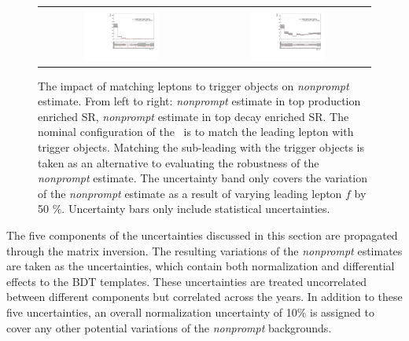 \begin{figure}[tbh!]
 \begin{center}
 \begin{tabular}{cc}
 \includegraphics[width=0.47\textwidth]{figures/Part3/Systematics/BDT_ST_MM}&
 \includegraphics[width=0.47\textwidth]{figures/Part3/Systematics/BDT_TT_MM} \\
 \end{tabular}
 \caption{The impact of matching leptons to trigger objects on \emph{nonprompt} estimate. From left to right: \emph{nonprompt} estimate in top production enriched \ac{SR}, \emph{nonprompt} estimate in top decay enriched \ac{SR}. The nominal configuration of the \mm~is to match the leading lepton with trigger objects. Matching the sub-leading with the trigger objects is taken as an alternative to evaluating the robustness of the \emph{nonprompt} estimate. The uncertainty band only covers the variation of the \emph{nonprompt} estimate as a result of varying leading lepton $f$ by 50 $\%$. Uncertainty bars only include statistical uncertainties.}
 \label{fig:MM_trigger}
 \end{center}
\end{figure}

The five components of the uncertainties discussed in this section are propagated through the matrix inversion. The resulting variations of the \emph{nonprompt} estimates are taken as the uncertainties, which contain both normalization and differential effects to the \ac{BDT} templates. These uncertainties are treated uncorrelated between different components but correlated across the years. In addition to these five uncertainties, an overall normalization uncertainty of 10$\%$ is assigned to cover any other potential variations of the \emph{nonprompt} backgrounds.

